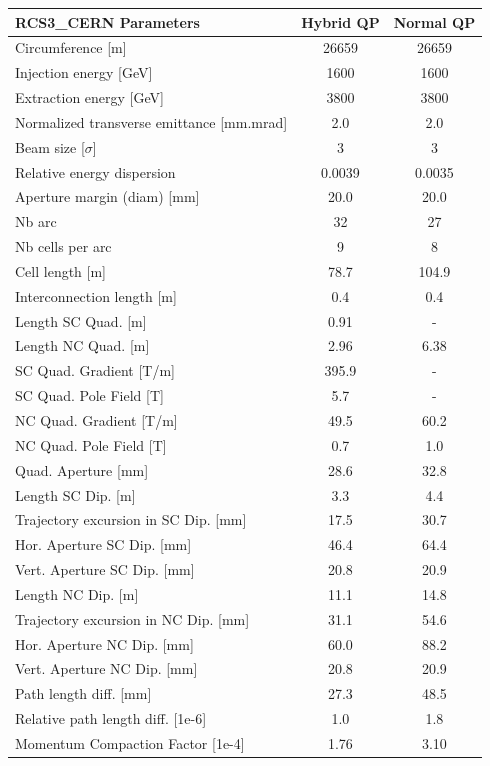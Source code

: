 \begin{tabular}{lcc}
\toprule
RCS3_CERN Parameters & Hybrid QP & Normal QP \\
\midrule
Circumference [m] & 26659 & 26659 \\
Injection energy [GeV] & 1600 & 1600 \\
Extraction energy [GeV] & 3800 & 3800 \\
Normalized transverse emittance [mm.mrad] & 2.0 & 2.0 \\
Beam size [$\sigma$] & 3 & 3 \\
Relative energy dispersion & 0.0039 & 0.0035 \\
Aperture margin (diam) [mm] & 20.0 & 20.0 \\
Nb arc & 32 & 27 \\
Nb cells per arc & 9 & 8 \\
Cell length [m] & 78.7 & 104.9 \\
Interconnection length [m] & 0.4 & 0.4 \\
Length SC Quad. [m] & 0.91 & - \\
Length NC Quad. [m] & 2.96 & 6.38 \\
SC Quad. Gradient [T/m] & 395.9 & - \\
SC Quad. Pole Field [T] & 5.7 & - \\
NC Quad. Gradient [T/m] & 49.5 & 60.2 \\
NC Quad. Pole Field [T] & 0.7 & 1.0 \\
Quad. Aperture [mm] & 28.6 & 32.8 \\
Length SC Dip. [m] & 3.3 & 4.4 \\
Trajectory excursion in SC Dip. [mm] & 17.5 & 30.7 \\
Hor. Aperture SC Dip. [mm] & 46.4 & 64.4 \\
Vert. Aperture SC Dip. [mm] & 20.8 & 20.9 \\
Length NC Dip. [m] & 11.1 & 14.8 \\
Trajectory excursion in NC Dip. [mm] & 31.1 & 54.6 \\
Hor. Aperture NC Dip. [mm] & 60.0 & 88.2 \\
Vert. Aperture NC Dip. [mm] & 20.8 & 20.9 \\
Path length diff. [mm] & 27.3 & 48.5 \\
Relative path length diff. [1e-6] & 1.0 & 1.8 \\
Momentum Compaction Factor [1e-4] & 1.76 & 3.10 \\
\bottomrule
\end{tabular}
